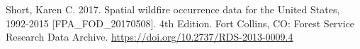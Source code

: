 \documentclass[conference]{IEEEtran}
\begin{document}
\begin{thebibliography}{00}
 Short, Karen C. 2017. Spatial wildfire occurrence data for the United States, 1992-2015 [FPA\_FOD\_20170508]. 4th Edition. Fort Collins, CO: Forest Service Research Data Archive. \url{https://doi.org/10.2737/RDS-2013-0009.4}

\end{thebibliography}
\end{document}
